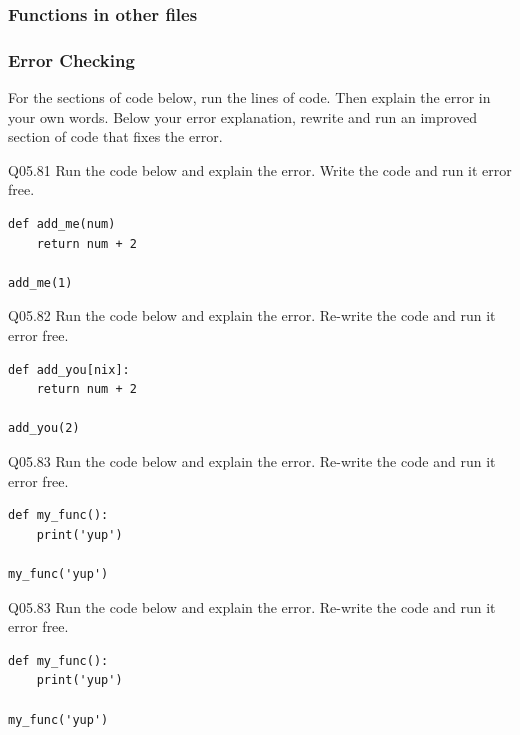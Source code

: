 \documentclass{book}
\newenvironment{problems}{}{}  %
\begin{document}
    




    
        \begin{problems}
        \subsubsection{Functions in other files}\label{functions-in-other-files}
        \end{problems}

    




    
        \subsubsection{Error Checking}\label{error-checking}

For the sections of code below, run the lines of code. Then explain the
error in your own words. Below your error explanation, rewrite and run
an improved section of code that fixes the error.

Q05.81 Run the code below and explain the error. Write the code and run
it error free.

\begin{lstlisting}
def add_me(num)
    return num + 2

add_me(1)
\end{lstlisting}

Q05.82 Run the code below and explain the error. Re-write the code and
run it error free.

\begin{lstlisting}
def add_you[nix]:
    return num + 2
    
add_you(2)
\end{lstlisting}

Q05.83 Run the code below and explain the error. Re-write the code and
run it error free.

\begin{lstlisting}
def my_func():
    print('yup')
    
my_func('yup')
\end{lstlisting}

Q05.83 Run the code below and explain the error. Re-write the code and
run it error free.

\begin{lstlisting}
def my_func():
    print('yup')
    
my_func('yup')
\end{lstlisting}
    
\end{document}
